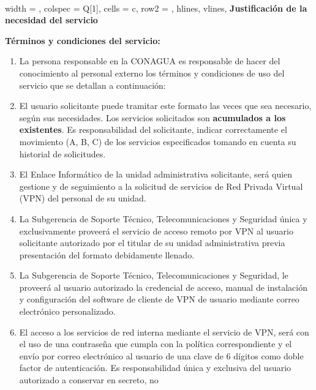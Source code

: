 \documentclass[letterpaper,11pt]{article}
\begin{document}
~ \\
\begin{tblr}[
	label = none,
	entry = none,
	]{
		width = \linewidth,
		colspec = {Q[1]},
		cells = {c},
		row{2} = {},
		hlines,
		vlines,
	}
	\textbf{Justificación de la necesidad del servicio} \\\JUSTIFICACION
\end{tblr}
\clearpage
\textbf{ \large Términos y condiciones del servicio:}
{  \footnotesize\begin{enumerate}
	\item La persona responsable en la CONAGUA es responsable de hacer del 
              conocimiento al personal externo los términos y condiciones de uso del 
              servicio que se detallan a continuación:
	\item El usuario solicitante puede tramitar este formato las veces que sea 
              necesario, según sus necesidades. Los servicios solicitados son \textbf {acumulados 
              a los existentes}. Es responsabilidad del solicitante, indicar correctamente 
              el movimiento (A, B, C) de los servicios especificados tomando en cuenta su 
              historial de solicitudes.
	\item El Enlace Informático de la unidad administrativa solicitante, será quien 
              gestione y de seguimiento a la solicitud de servicios de Red Privada Virtual 
              (VPN) del personal de su unidad.
	\item La Subgerencia de Soporte Técnico, Telecomunicaciones y Seguridad única y 
              exclusivamente proveerá el servicio de acceso remoto por VPN al usuario solicitante 
              autorizado por el titular de su unidad administrativa previa presentación del formato 
              debidamente llenado.
	\item La Subgerencia de Soporte Técnico, Telecomunicaciones y Seguridad, le proveerá al 
              usuario autorizado la credencial de acceso, manual de instalación y configuración del 
              software de cliente de VPN de usuario mediante correo electrónico personalizado.
	\item El acceso a los servicios de red interna mediante el servicio de VPN, será con el 
              uso de una contraseña que cumpla con la política correspondiente y el envío por correo 
              electrónico al usuario de una clave de 6 dígitos como doble factor de autenticación. 
              Es responsabilidad única y exclusiva del usuario autorizado a conservar en secreto, no 

\end{enumerate}}
\end{document}
